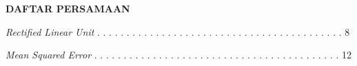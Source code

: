 \newpage %
\begin{center}
    \begin{large}\textbf{DAFTAR PERSAMAAN}\\\end{large}
\end{center}
\vspace{5mm}
\noindent \textit{Rectified Linear Unit}
. . . . . . . . . . . . . . . . . . . . . . . . . . . . . . . . . . . . . . . . . . 8

\noindent \textit{Mean Squared Error}
. . . . . . . . . . . . . . . . . . . . . . . . . . . . . . . . . . . . . . . . . . 12
